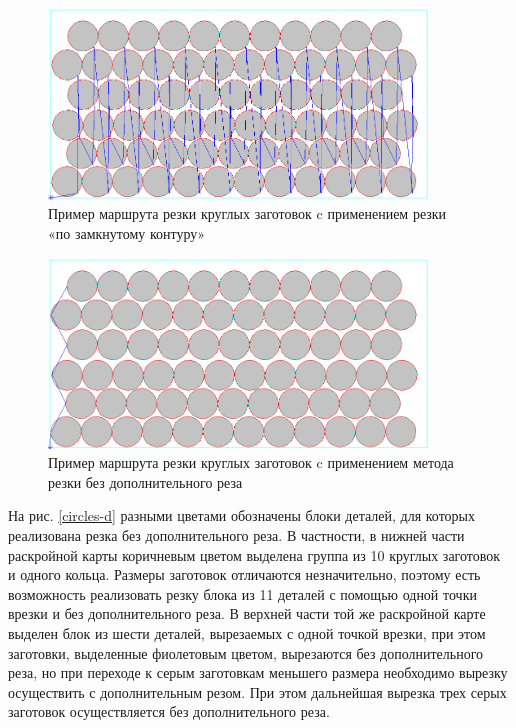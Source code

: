 \documentclass{article}
\begin{document}
\begin{figure}
  \begin{center}
  \includegraphics[width=0.9\textwidth]{circles-a.png}
  \caption{Пример маршрута резки круглых заготовок c применением резки «по замкнутому контуру»}
  \label{circles-a}
  \end{center}
\end{figure}

\begin{figure}
  \begin{center}
  \includegraphics[width=0.9\textwidth]{circles-b.png}
  \caption{Пример маршрута резки круглых заготовок c применением метода резки без дополнительного реза}
  \label{circles-b}
  \end{center}
\end{figure}

На рис. \ref{circles-d}
разными цветами обозначены блоки деталей,
для которых реализована резка без дополнительного реза.
В частности, в нижней  части раскройной карты коричневым цветом
выделена группа из 10 круглых заготовок и одного кольца.
Размеры заготовок отличаются незначительно,
поэтому есть возможность реализовать резку блока из 11 деталей с
помощью одной точки врезки и без дополнительного реза.
В  верхней части той же раскройной карте выделен блок из шести деталей,
вырезаемых с одной точкой врезки, при этом заготовки,
выделенные фиолетовым цветом, вырезаются без дополнительного реза,
но при переходе к серым заготовкам меньшего размера необходимо
вырезку осуществить с дополнительным резом.
При этом дальнейшая вырезка трех серых заготовок
осуществляется без дополнительного реза.
\end{document}

